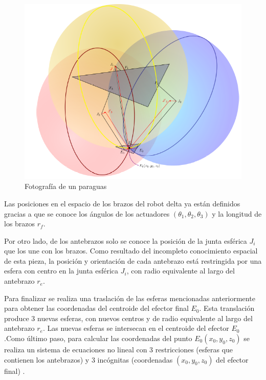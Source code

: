         \begin{figure}[htb]
             \centering
             \includegraphics[width=0.8\linewidth]{Main/Chapter4/Images4/Metodo_A_Modelacion_Cinematica_Posicion_3.png}
              \caption{Fotografía de un paraguas}
              \label{f:Cap4_Metodo_A_Modelacion_Cinematica_Posicion_3}
        \end{figure}
        
        Las posiciones en el espacio de los brazos del robot delta ya están definidos gracias a que se conoce los ángulos de los actuadores $({\theta }_1,{\theta }_2,{\theta }_3)$ y la longitud de los brazos $r_f$. 
        
        Por otro lado, de los antebrazos solo se conoce la posición de la junta esférica $J_i$ que los une con los brazos. Como resultado del incompleto conocimiento espacial de esta pieza, la posición y orientación de cada antebrazo está restringida por una esfera con centro en la junta esférica $J_i$, con radio equivalente al largo del antebrazo $r_e$. 
        
        Para finalizar se realiza una traslación de las esferas mencionadas anteriormente para obtener las coordenadas del centroide del efector final $E_0$. Esta translación produce 3 nuevas esferas, con nuevos centros y de radio equivalente al largo del antebrazo $r_e$. Las nuevas esferas se intersecan en el centroide del efector $E_0$ .Como último paso, para calcular las coordenadas del punto $E_0(x_0,y_0,z_0)$ se realiza un sistema de ecuaciones no lineal con 3 restricciones (esferas que contienen los antebrazos) y 3 incógnitas (coordenadas $(x_0,y_0,z_0)$ del efector final) .

        \newpage
        
